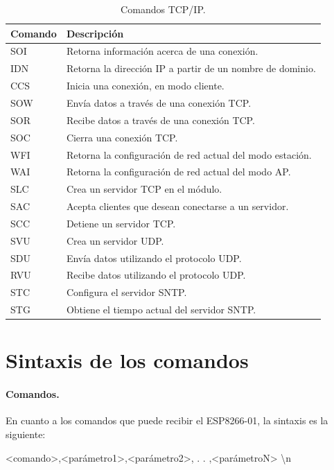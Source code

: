 \documentclass[a4paper,spanish,11pt]{article}
\begin{document}
\begin{table}[H]
	\centering
	\renewcommand\arraystretch{1.5}
	\begin{tabular}{@{} ll @{}}
		\toprule
		\textbf{Comando} & \textbf{Descripción} \\ 
		\midrule
		SOI & Retorna información acerca de una conexión. \\
		IDN & Retorna la dirección IP a partir de un nombre de dominio. \\
		CCS & Inicia una conexión, en modo cliente.  \\
		SOW & Envía datos a través de una conexión TCP. \\
		SOR & Recibe datos a través de una conexión TCP. \\
		SOC & Cierra una conexión TCP. \\ 
		WFI & Retorna la configuración de red actual del modo estación. \\
		WAI & Retorna la configuración de red actual del modo AP. \\
		SLC & Crea un servidor TCP en el módulo. \\
		SAC & Acepta clientes que desean conectarse a un servidor. \\ 
		SCC & Detiene un servidor TCP. \\ 
		SVU & Crea un servidor UDP. \\ 
		SDU & Envía datos utilizando el protocolo UDP. \\
		RVU & Recibe datos utilizando el protocolo UDP. \\ 
		STC & Configura el servidor SNTP. \\ 
		STG & Obtiene el tiempo actual del servidor SNTP. \\
		\bottomrule
	\end{tabular}
	\caption{Comandos TCP/IP.}
	\label{tab:coomnados_tcpip}
\end{table}

\section{Sintaxis de los comandos}

\paragraph{Comandos.} En cuanto a los comandos que puede recibir el ESP8266-01, la sintaxis es la siguiente: \\ 

\begin{tt}
	<comando>,<parámetro1>,<parámetro2>, . . ,<parámetroN> \textbackslash n
\end{tt}
\\
\end{document}
